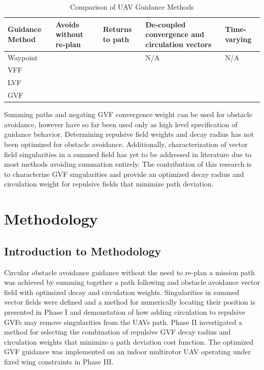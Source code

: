 \documentclass[numbered,pdftex]{ohio-etd}
\begin{document}
\setlength{\tabcolsep}{10pt} %
\renewcommand{\arraystretch}{0.5} %
\begin{table}[]
	\caption{Comparison of UAV Guidance Methods}
	\label{table:compareMeth}
	\begin{tabular}{|C{2.5cm}|C{2.5cm}|C{2.5cm}|C{2.5cm}|C{2.5cm}|}	
		\hline
		Guidance Method & Avoids without re-plan    & Returns to path   & De-coupled convergence and circulation vectors       & Time-varying              \\ \hline
		Waypoint        &                           & \Checkmark & N/A                       & N/A                       \\ \hline
		VFF             & \Checkmark &                           &                           &                           \\ \hline
		LVF             & \Checkmark & \Checkmark &                           &                           \\ \hline
		GVF             & \Checkmark & \Checkmark & \Checkmark & \Checkmark \\ \hline
	\end{tabular}
\end{table}


 Summing paths and negating GVF convergence weight can be used for obstacle avoidance, however have so far been used only as high level specification of guidance behavior. Determining repulsive field weights and decay radius has not been optimized for obstacle avoidance. Additionally, characterization of vector field singularities in a summed field has yet to be addressed in literature due to most methods avoiding summation entirely. The contribution of this research is to characterize GVF singularities and provide an optimized decay radius and circulation weight for repulsive fields that minimize path deviation. 

\chapter{Methodology}


\section{Introduction to Methodology}
Circular obstacle avoidance guidance without the need to re-plan a mission path was achieved by summing together a path following and obstacle avoidance vector field with optimized decay and circulation weights. Singularities in summed vector fields were defined and a method for numerically locating their position is presented in Phase I and demonstation of how adding circulation to repulsive GVFs may remove singularities from the UAVs path. Phase II investigated a method for selecting the combination of repulsive GVF decay radius and circulation weights that minimize a path deviation cost function. The optimized GVF guidance was implemented on an indoor multirotor UAV operating under fixed wing constraints in Phase III.
\end{document}
